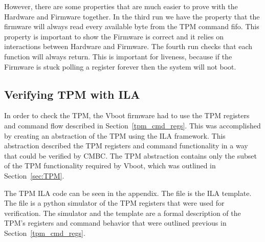 However, there are some properties that are much easier to prove with the 
Hardware and Firmware together.
In the third run we have the property that the firmware will always read every available byte from the TPM command fifo.
This property is important to show the Firmware is correct and it relies on interactions between Hardware and Firmware.
The fourth run checks that each function will always return. 
This is important for liveness, because if the Firmware is stuck polling a register forever then the system will not boot.


\subsection{Verifying TPM with ILA}   

In order to check the TPM, the Vboot firmware had to use the TPM registers and
command flow described in Section~\ref{tpm_cmd_regs}.
This was accomplished by creating an abstraction of the TPM using the ILA framework.
This abstraction described the TPM registers and command functionality in a way that could be verified by CMBC\@.
The TPM abstraction contains only the subset of the TPM functionality required by Vboot, which was outlined in Section~\ref{sec:TPM}.

The TPM ILA code can be seen in the appendix.
The file  is the ILA template.
The file  is a python simulator of the TPM registers that
were  used for verification.
The simulator and the template are a formal description of the TPM's registers and command behavior that were outlined previous in Section~\ref{tpm_cmd_regs}. 
